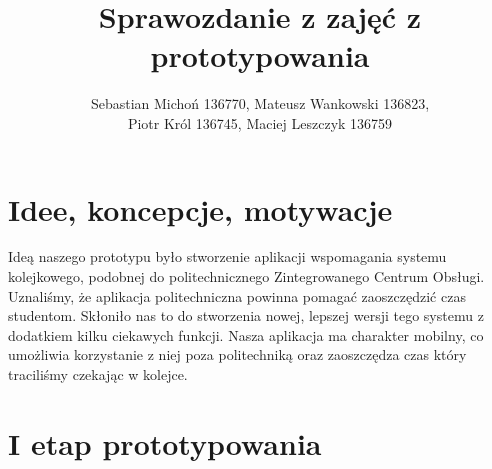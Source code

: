 \documentclass[12pt]{article}
\begin{document}
\title{Sprawozdanie z zajęć z prototypowania}
\author{Sebastian Michoń 136770, Mateusz Wankowski 136823,\\ Piotr Król 136745, Maciej Leszczyk 136759}
\date{\vspace{-3ex}}
\maketitle

\section{Idee, koncepcje, motywacje}
Ideą naszego prototypu było stworzenie aplikacji wspomagania systemu kolejkowego, podobnej do politechnicznego Zintegrowanego Centrum Obsługi. Uznaliśmy, że aplikacja politechniczna powinna pomagać zaoszczędzić czas studentom. Skłoniło nas to do stworzenia nowej, lepszej wersji tego systemu z dodatkiem kilku ciekawych funkcji. Nasza aplikacja ma charakter mobilny, co umożliwia korzystanie z niej poza politechniką oraz zaoszczędza czas który traciliśmy czekając w kolejce.

\section{I etap prototypowania}
\end{document}
